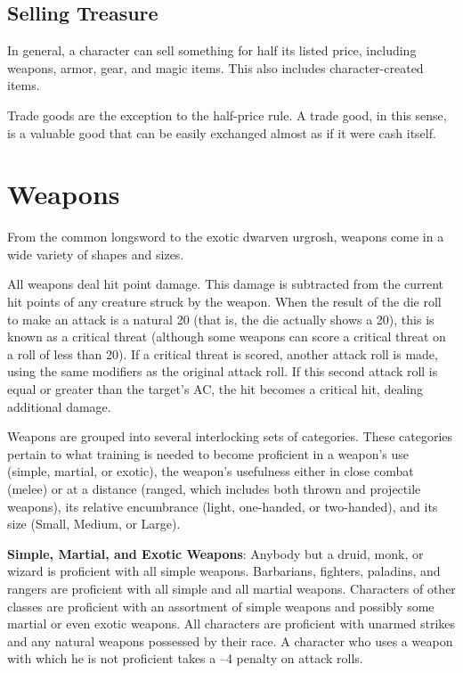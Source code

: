 \subsection{Selling Treasure}

		
In general, a character can sell something for half its listed price, including weapons, armor, gear, and magic items. This also includes character-created items.
		
Trade goods are the exception to the half-price rule. A trade good, in this sense, is a valuable good that can be easily exchanged almost as if it were cash itself.
		
\section{Weapons}

		
From the common longsword to the exotic dwarven urgrosh, weapons come in a wide variety of shapes and sizes. 
		
All weapons deal hit point damage. This damage is subtracted from the current hit points of any creature struck by the weapon. When the result of the die roll to make an attack is a natural 20 (that is, the die actually shows a 20), this is known as a critical threat (although some weapons can score a critical threat on a roll of less than 20). If a critical threat is scored, another attack roll is made, using the same modifiers as the original attack roll. If this second attack roll is equal or greater than the target's AC, the hit becomes a critical hit, dealing additional damage.
		
Weapons are grouped into several interlocking sets of categories. These categories pertain to what training is needed to become proficient in a weapon's use (simple, martial, or exotic), the weapon's usefulness either in close combat (melee) or at a distance (ranged, which includes both thrown and projectile weapons), its relative encumbrance (light, one-handed, or two-handed), and its size (Small, Medium, or Large).
		
\textbf{Simple, Martial, and Exotic Weapons}: Anybody but a druid, monk, or wizard is proficient with all simple weapons. Barbarians, fighters, paladins, and rangers are proficient with all simple and all martial weapons. Characters of other classes are proficient with an assortment of simple weapons and possibly some martial or even exotic weapons. All characters are proficient with unarmed strikes and any natural weapons possessed by their race. A character who uses a weapon with which he is not proficient takes a --4 penalty on attack rolls.
		

